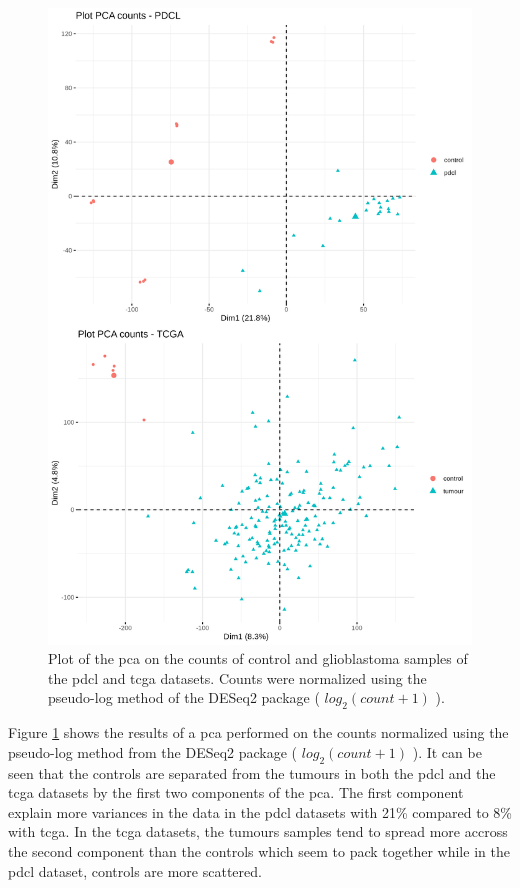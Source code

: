 \begin{figure}
    \begin{center}
        \includegraphics[height=0.8\textheight]{img/pca_plot}
        \caption{
            Plot of the \acrshort{pca} on the counts of control and glioblastoma samples of the \acrshort{pdcl} and \acrshort{tcga} datasets.
            Counts were normalized using the pseudo-log method of the DESeq2 package ( $log_2(count+1)$ ).
        }
        \label{fig:pca-plot}
    \end{center}
\end{figure}

Figure \ref*{fig:pca-plot} shows the results of a \acrfull{pca} performed on the counts normalized using the pseudo-log method from the DESeq2 package ( $log_2(count+1)$ ).
It can be seen that the controls are separated from the tumours  in both the \acrshort{pdcl} and the \acrshort{tcga} datasets by the first two components of the \acrshort{pca}.
The first component explain more variances in the data in the \acrshort{pdcl} datasets with 21\% compared to 8\% with \acrshort{tcga}.
In the \acrshort{tcga} datasets, the tumours samples tend to spread more accross the second component than the controls which seem to pack together while in the \acrshort{pdcl} dataset, controls are more scattered. 

